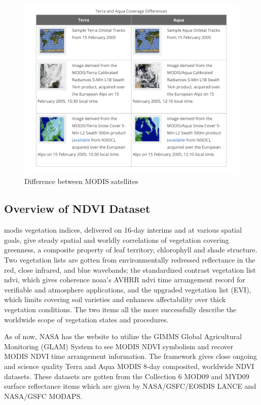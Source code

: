  \begin{figure}[H]
            \centering
            \includegraphics[width=1.0\linewidth]{figures/ch3/satellites.png}
            \caption{\label{fig:modis_satellites_difference} Difference between MODIS satellites \cite{NSIDC}}
    \end{figure}

\subsection{Overview of NDVI Dataset}

\gls{modis} vegetation indices, delivered on 16-day interims and at various spatial goals, give steady spatial and worldly correlations of vegetation covering greenness, a composite property of leaf territory, chlorophyll and shade structure. Two vegetation lists are gotten from environmentally redressed reflectance in the red, close infrared, and blue wavebands; the standardized contrast vegetation list \gls{ndvi}, which gives coherence \gls{noaa}'s AVHRR \gls{ndvi} time arrangement record for verifiable and atmosphere applications, and the upgraded vegetation list (EVI), which limits covering soil varieties and enhances affectability over thick vegetation conditions. The two items all the more successfully describe the worldwide scope of vegetation states and procedures. 

As of now, NASA has the website to utilize the GIMMS Global Agricultural Monitoring (GLAM) System to see MODIS NDVI symbolism and recover MODIS NDVI time arrangement information. The framework gives close ongoing and science quality Terra and Aqua MODIS 8-day composited, worldwide NDVI datasets. These datasets are gotten from the Collection 6 MOD09 and MYD09 surface reflectance items which are given by NASA/GSFC/EOSDIS LANCE and NASA/GSFC MODAPS.

